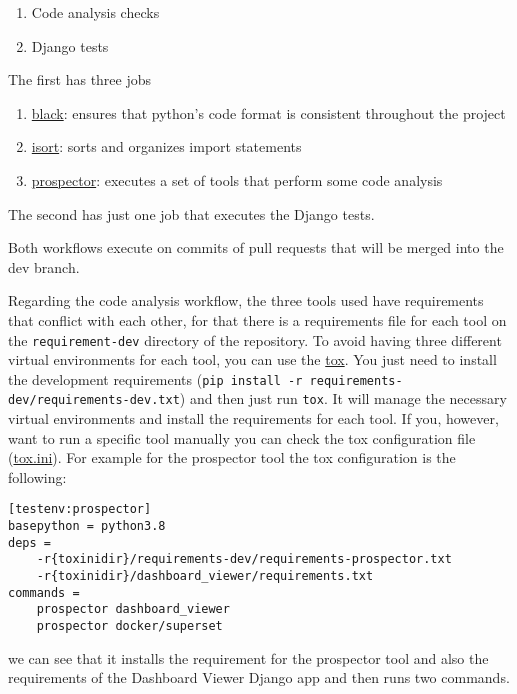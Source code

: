 \documentclass[
]{book}
\providecommand{\tightlist}{%
  \setlength{\itemsep}{0pt}\setlength{\parskip}{0pt}}
\begin{document}
\begin{enumerate}
\def\labelenumi{\arabic{enumi}.}
\tightlist
\item
  Code analysis checks
\item
  Django tests
\end{enumerate}

The first has three jobs

\begin{enumerate}
\def\labelenumi{\arabic{enumi}.}
\tightlist
\item
  \href{https://github.com/psf/black}{black}: ensures that python's code format is consistent throughout the project
\item
  \href{https://github.com/PyCQA/isort}{isort}: sorts and organizes import statements
\item
  \href{https://github.com/PyCQA/prospector}{prospector}: executes a set of tools that perform some code analysis
\end{enumerate}

The second has just one job that executes the Django tests.

Both workflows execute on commits of pull requests that will be merged into the dev branch.

Regarding the code analysis workflow, the three tools used have requirements that conflict with each other, for that there is a requirements file for each tool on the \texttt{requirement-dev} directory of the repository.
To avoid having three different virtual environments for each tool, you can use the \href{https://tox.readthedocs.io/}{tox}.
You just need to install the development requirements (\texttt{pip\ install\ -r\ requirements-dev/requirements-dev.txt}) and then just run \texttt{tox}.
It will manage the necessary virtual environments and install the requirements for each tool.
If you, however, want to run a specific tool manually you can check the tox configuration file (\href{https://github.com/EHDEN/NetworkDashboards/blob/master/tox.ini}{tox.ini}).
For example for the prospector tool the tox configuration is the following:

\begin{verbatim}
[testenv:prospector]
basepython = python3.8
deps =
    -r{toxinidir}/requirements-dev/requirements-prospector.txt
    -r{toxinidir}/dashboard_viewer/requirements.txt
commands =
    prospector dashboard_viewer
    prospector docker/superset
\end{verbatim}

we can see that it installs the requirement for the prospector tool and also the requirements of the Dashboard Viewer Django app and then runs two commands.
\end{document}
